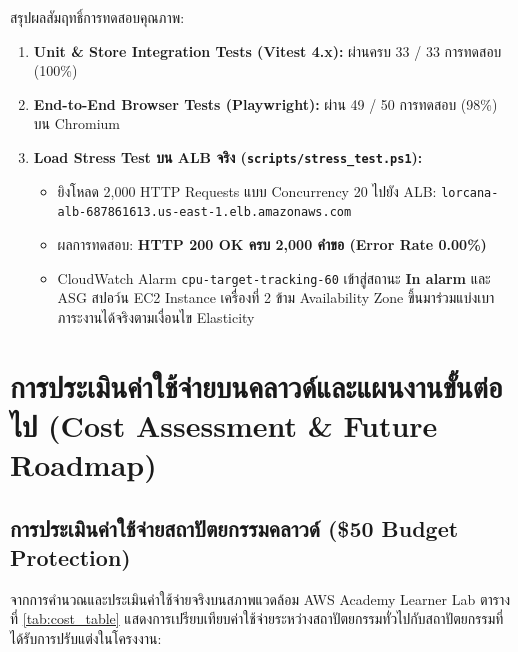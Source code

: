 \documentclass[12pt,a4paper]{report}
\begin{document}
สรุปผลสัมฤทธิ์การทดสอบคุณภาพ:
\begin{enumerate}
    \item \textbf{Unit \& Store Integration Tests (Vitest 4.x):} ผ่านครบ 33 / 33 การทดสอบ (100\%)
    \item \textbf{End-to-End Browser Tests (Playwright):} ผ่าน 49 / 50 การทดสอบ (98\%) บน Chromium
    \item \textbf{Load Stress Test บน ALB จริง (\texttt{scripts/stress\_test.ps1}):}
    \begin{itemize}
        \item ยิงโหลด 2,000 HTTP Requests แบบ Concurrency 20 ไปยัง ALB: \texttt{lorcana-alb-687861613.us-east-1.elb.amazonaws.com}
        \item ผลการทดสอบ: \textbf{HTTP 200 OK ครบ 2,000 คำขอ (Error Rate 0.00\%)}
        \item CloudWatch Alarm \texttt{cpu-target-tracking-60} เข้าสู่สถานะ \textbf{In alarm} และ ASG สปอว์น EC2 Instance เครื่องที่ 2 ข้าม Availability Zone ขึ้นมาร่วมแบ่งเบาภาระงานได้จริงตามเงื่อนไข Elasticity
    \end{itemize}
\end{enumerate}

\chapter{การประเมินค่าใช้จ่ายบนคลาวด์และแผนงานขั้นต่อไป (Cost Assessment \& Future Roadmap)}

\section{การประเมินค่าใช้จ่ายสถาปัตยกรรมคลาวด์ (\$50 Budget Protection)}
จากการคำนวณและประเมินค่าใช้จ่ายจริงบนสภาพแวดล้อม AWS Academy Learner Lab ตารางที่ \ref{tab:cost_table} แสดงการเปรียบเทียบค่าใช้จ่ายระหว่างสถาปัตยกรรมทั่วไปกับสถาปัตยกรรมที่ได้รับการปรับแต่งในโครงงาน:
\end{document}
